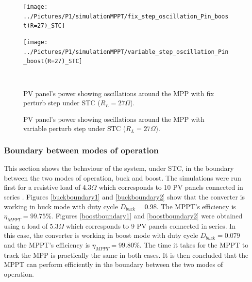 \vspace{1cm}
\begin{figure}[H]
	\begin{minipage}[c]{0.6\textwidth}
		\centering
		\texttt{[image: ../Pictures/P1/simulationMPPT/fix\_step\_oscillation\_Pin\_boost(R=27)\_STC]} %
	\end{minipage}%
	\hfill
	\begin{minipage}[c]{0.6\textwidth}
		\centering
		\texttt{[image: ../Pictures/P1/simulationMPPT/variable\_step\_oscillation\_Pin\_boost(R=27)\_STC]} %
	\end{minipage} \\ %
	\begin{minipage}[t]{0.6\textwidth}
		\caption{PV panel's power showing oscillations around the MPP with fix perturb step under STC ($R_{L}=27\Omega$).} %
		\label{boostoscillationfix}
	\end{minipage}%
	\hfill
	\begin{minipage}[t]{0.6\textwidth}
		\caption{PV panel's power showing oscillations around the MPP with variable perturb step under STC ($R_{L}=27\Omega$).} %
		\label{boostoscillationvar}
	\end{minipage}
\end{figure}

\subsubsection*{Boundary between modes of operation}


This section shows the behaviour of the system, under STC, in the boundary between the two modes of operation, buck and boost. The simulations were run first for a resistive load of 4.3$\Omega$ which corresponds to 10 PV panels connected in series . Figures \ref{buckboundary1} and \ref{buckboundary2} show that the converter is working in buck mode with duty cycle $D_{buck}=0.98$. The MPPT's efficiency is $\eta_{MPPT} = 99.75\% $. Figures \ref{boostboundary1} and \ref{boostboundary2} were obtained using a load of 5.3$\Omega$ which corresponds to 9 PV panels connected in series. In this case, the converter is working in boost mode with duty cycle $D_{buck}=0.079$ and the MPPT's efficiency is $\eta_{MPPT} = 99.80\% $. The time it takes for the MPPT to track the MPP is practically the same in both cases. It is then concluded that the MPPT can perform efficiently in the boundary between the two modes of operation.

